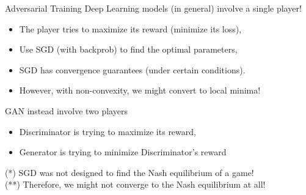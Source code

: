 \begin{frame} {Adversarial Training}  
  \vspace{2mm}
Deep Learning models (in general) involve a single player!
  \vspace{1mm}
  \begin{itemize}
    \item The player tries to maximize its reward (minimize its loss),
    \item Use SGD (with backprob) to find the optimal parameters,
    \item SGD has convergence guarantees (under certain conditions).
    \item However, with non-convexity, we might convert to local minima!
  \end{itemize}
    \vspace{3mm} 
GAN instead involve two players
     \vspace{1mm}
  \begin{itemize}
    \item Discriminator is trying to maximize its reward,
    \item Generator is trying to minimize Discriminator's reward
  \end{itemize}
   \vspace{3mm}
(*) SGD was not designed to find the Nash equilibrium of a game! \\
  \vspace{2mm}
(**) Therefore, we might not converge to the Nash equilibrium at all!
      
 \end{frame}
 
 
% 


